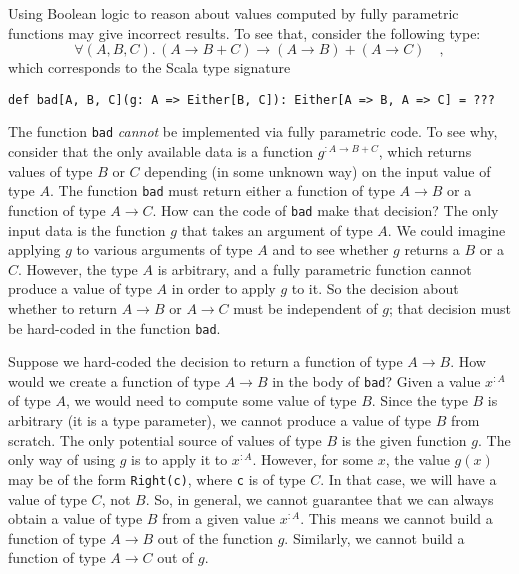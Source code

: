 Using Boolean logic to reason about values computed by fully parametric
functions may give incorrect results. To see that, consider the following
type:
\begin{equation}
\forall(A,B,C).\,\left(A\rightarrow B+C\right)\rightarrow\left(A\rightarrow B\right)+\left(A\rightarrow C\right)\quad,\label{eq:ch-example-boolean-bad-type}
\end{equation}
which corresponds to the Scala type signature
\begin{lstlisting}
def bad[A, B, C](g: A => Either[B, C]): Either[A => B, A => C] = ???
\end{lstlisting}
The function \lstinline!bad! \emph{cannot} be implemented via fully
parametric code. To see why, consider that the only available data
is a function $g^{:A\rightarrow B+C}$, which returns values of type
$B$ or $C$ depending (in some unknown way) on the input value of
type $A$. The function \lstinline!bad! must return either a function
of type $A\rightarrow B$ or a function of type $A\rightarrow C$.
How can the code of \lstinline!bad! make that decision? The only
input data is the function $g$ that takes an argument of type $A$.
We could imagine applying $g$ to various arguments of type $A$ and
to see whether $g$ returns a $B$ or a $C$. However, the type $A$
is arbitrary, and a fully parametric function cannot produce a value
of type $A$ in order to apply $g$ to it. So the decision about whether
to return $A\rightarrow B$ or $A\rightarrow C$ must be independent
of $g$; that decision must be hard-coded in the function \lstinline!bad!.

Suppose we hard-coded the decision to return a function of type $A\rightarrow B$.
How would we create a function of type $A\rightarrow B$ in the body
of \lstinline!bad!? Given a value $x^{:A}$ of type $A$, we would
need to compute some value of type $B$. Since the type $B$ is arbitrary
(it is a type parameter), we cannot produce a value of type $B$ from
scratch. The only potential source of values of type $B$ is the given
function $g$. The only way of using $g$ is to apply it to $x^{:A}$.
However, for some $x$, the value $g(x)$ may be of the form \lstinline!Right(c)!,
where \lstinline!c! is of type $C$. In that case, we will have a
value of type $C$, not $B$. So, in general, we cannot guarantee
that we can always obtain a value of type $B$ from a given value
$x^{:A}$. This means we cannot build a function of type $A\rightarrow B$
out of the function $g$. Similarly, we cannot build a function of
type $A\rightarrow C$ out of $g$. 

